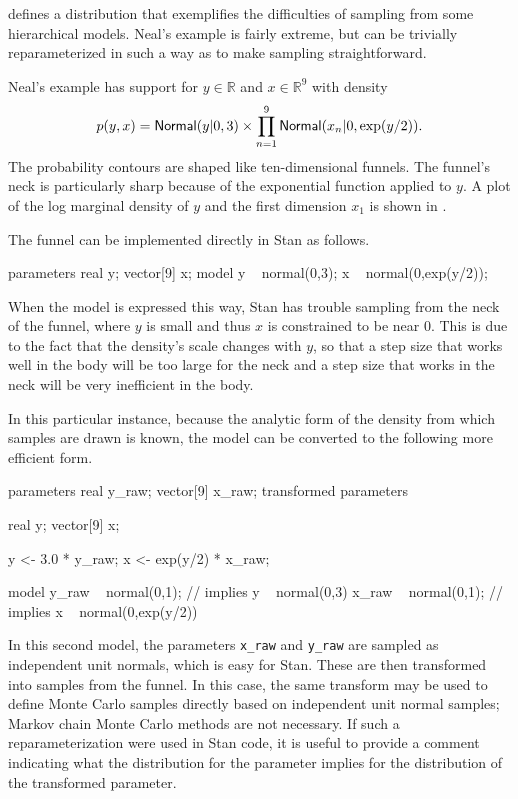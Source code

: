 \citep{Neal:2003} defines a distribution that exemplifies the
difficulties of sampling from some hierarchical models.  Neal's
example is fairly extreme, but can be trivially reparameterized in
such a way as to make sampling straightforward.

Neal's example has support for $y \in
\mathbb{R}$ and  $x \in \mathbb{R}^9$ with density
%
\[
p(y,x) = \distro{Normal}(y|0,3) \times \prod_{n=1}^9
\distro{Normal}(x_n|0,\exp(y/2)).
\]
%
The probability contours are shaped like ten-dimensional funnels.  The
funnel's neck is particularly sharp because of the exponential
function applied to $y$.  A plot of the log marginal density of $y$
and the first dimension $x_1$ is shown in .

The funnel can be implemented directly in Stan as follows.
%
\begin{stancode}
parameters {  
  real y;
  vector[9] x;
}
model {
  y ~ normal(0,3);
  x ~ normal(0,exp(y/2));
}
\end{stancode}
%
When the model is expressed this way, Stan has trouble sampling from
the neck of the funnel, where $y$ is small and thus $x$ is constrained
to be near 0.  This is due to the fact that the density's scale
changes with $y$, so that a step size that works well in the body will
be too large for the neck and a step size that works in the neck will be
very inefficient in the body.

In this particular instance, because the analytic form of the density
from which samples are drawn is known, the model can be converted to
the following more efficient form.
%
\begin{stancode}
parameters {  
  real y_raw;
  vector[9] x_raw;
}
transformed parameters {
  real y;
  vector[9] x;

  y <- 3.0 * y_raw;  
  x <- exp(y/2) * x_raw;
}
model {
  y_raw ~ normal(0,1); // implies y ~ normal(0,3) 
  x_raw ~ normal(0,1); // implies x ~ normal(0,exp(y/2))  
}
\end{stancode}
%
In this second model, the parameters \Verb|x_raw| and \Verb|y_raw| are
sampled as independent unit normals, which is easy for Stan.  These
are then transformed into samples from the funnel.  In this case, the
same transform may be used to define Monte Carlo samples directly
based on independent unit normal samples; Markov chain Monte Carlo
methods are not necessary. If such a reparameterization were used in
Stan code, it is useful to provide a comment indicating what the
distribution for the parameter implies for the distribution of the
transformed parameter.


